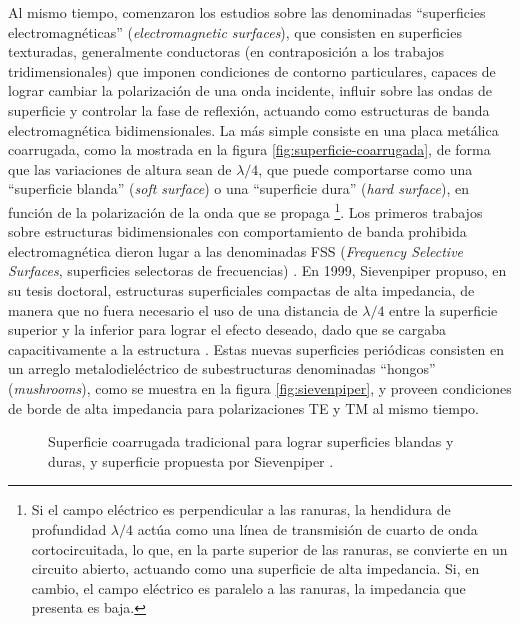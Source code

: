 Al mismo tiempo, comenzaron los estudios sobre las denominadas \enquote{superficies electromagnéticas} (\textit{electromagnetic surfaces}), que consisten en superficies texturadas, generalmente conductoras (en contraposición a los trabajos tridimensionales) que imponen condiciones de contorno particulares, capaces de lograr cambiar la polarización de una onda incidente, influir sobre las ondas de superficie y controlar la fase de reflexión, actuando como estructuras de banda electromagnética bidimensionales. La más simple consiste en una placa metálica coarrugada, como la mostrada en la figura \ref{fig:superficie-coarrugada}, de forma que las variaciones de altura sean de $\lambda/4$, que puede comportarse como una \enquote{superficie blanda} (\textit{soft surface}) o una \enquote{superficie dura} (\textit{hard surface}), en función de la polarización de la onda que se propaga \footnote{Si el campo eléctrico es perpendicular a las ranuras, la hendidura de profundidad $\lambda/4$ actúa como una línea de transmisión de cuarto de onda cortocircuitada, lo que, en la parte superior de las ranuras, se convierte en un circuito abierto, actuando como una superficie de alta impedancia. Si, en cambio, el campo eléctrico es paralelo a las ranuras, la impedancia que presenta es baja.}. Los primeros trabajos sobre estructuras bidimensionales con comportamiento de banda prohibida electromagnética dieron lugar a las denominadas FSS (\textit{Frequency Selective Surfaces}, superficies selectoras de frecuencias) \cite{Munk:libro}. En 1999, Sievenpiper \cite{Sievenpiper:Thesis} propuso, en su tesis doctoral, estructuras superficiales compactas de alta impedancia, de manera que no fuera necesario el uso de una distancia de $\lambda/4$ entre la superficie superior y la inferior para lograr el efecto deseado, dado que se cargaba capacitivamente a la estructura \cite{Marcela:Tesis} \cite{Sievenpiper:HIESForbiddenBand}. Estas nuevas superficies periódicas consisten en un arreglo metalodieléctrico de subestructuras denominadas \enquote{hongos} (\textit{mushrooms}), como se muestra en la figura \ref{fig:sievenpiper}, y proveen condiciones de borde de alta impedancia para polarizaciones TE y TM al mismo tiempo.

\begin{figure}[H]
	\centering 
	\hspace{30pt}
	\caption{Superficie coarrugada tradicional para lograr superficies blandas y duras, y superficie propuesta por Sievenpiper \cite{Sievenpiper:Thesis}.}
	\label{fig:sievenpiper-comparacion}
\end{figure}

